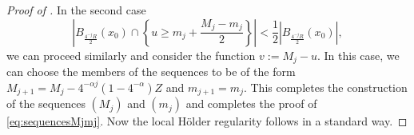 \documentclass[10pt,a4paper]{amsart}
\begin{document}
\begin{proof} [Proof of ]
In the second case
\[ \left| B_{\frac{4^{-j}R}{2}}(x_0) \cap \left\{ u\geq m_{j} + \frac{M_j-m_j}{2} \right\} \right| < \frac{1}{2}\left| B_{\frac{4^{-j}R}{2}}(x_0) \right|, \]
we can proceed similarly and consider the function $v:=M_j-u$. In this case, we can choose the members of the sequences to be of the form $M_{j+1} = M_j-4^{-\alpha j}(1-4^{-\alpha})Z$ and $m_{j+1}=m_j$. This completes the construction of the sequences $(M_j)$ and $(m_j)$ and completes the proof of \eqref{eq:sequencesMjmj}. Now the local Hölder regularity follows in a standard way.
\end{proof}
\end{document}
